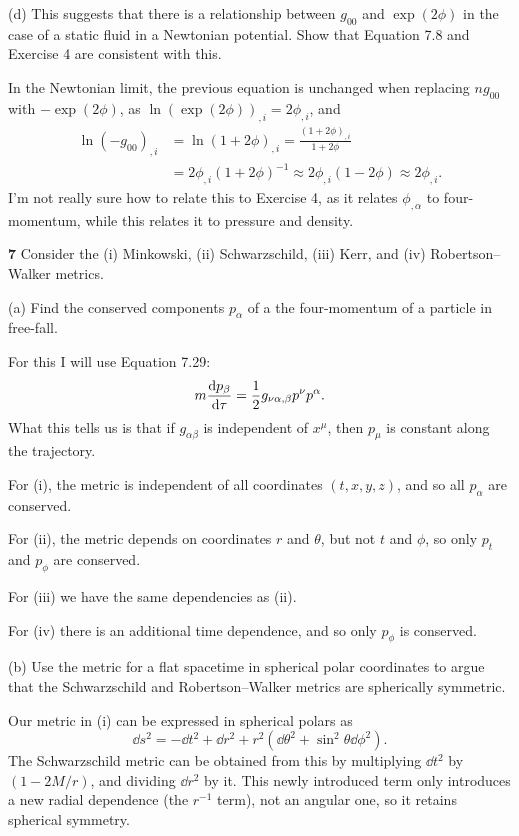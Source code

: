 \documentclass[gr-notes.tex]{subfiles}
\begin{document}
(d) This suggests that there is a relationship between $g_{00}$ and $\exp(2\phi)$ in the case of a static fluid in a Newtonian potential. Show that Equation 7.8 and Exercise 4 are consistent with this.

In the Newtonian limit, the previous equation is unchanged when replacing $ng_{00}$ with $-\exp(2\phi)$, as $\ln(\exp(2\phi))_{,i} = 2 \phi_{,i}$, and
%
\begin{align*}
  \ln(-g_{00})_{,i} &=
  \ln(1 + 2\phi)_{,i} =
  \frac{(1 + 2\phi)_{,i}}{1 + 2\phi}
  \\ &=
  2 \phi_{,i} (1 + 2\phi)^{-1} \approx
  2 \phi_{,i} (1 - 2\phi) \approx
  2 \phi_{,i}.
\end{align*}
%
I'm not really sure how to relate this to Exercise 4, as it relates $\phi_{,\alpha}$ to four-momentum, while this relates it to pressure and density.


\textbf{7}
Consider the (i) Minkowski, (ii) Schwarzschild, (iii) Kerr, and (iv) Robertson--Walker metrics.

(a) Find the conserved components $p_\alpha$ of a the four-momentum of a particle in free-fall.

For this I will use Equation 7.29:
%
\begin{displaymath}
  m \dv{p_\beta}{\tau} = \frac{1}{2} g_{\nu\alpha,\beta} p^\nu p^\alpha.
\end{displaymath}
%
What this tells us is that if $g_{\alpha\beta}$ is independent of $x^\mu$, then $p_\mu$ is constant along the trajectory.

For (i), the metric is independent of all coordinates $(t,x,y,z)$, and so all $p_\alpha$ are conserved.

For (ii), the metric depends on coordinates $r$ and $\theta$, but not $t$ and $\phi$, so only $p_t$ and $p_\phi$ are conserved.

For (iii) we have the same dependencies as (ii).

For (iv) there is an additional time dependence, and so only $p_\phi$ is conserved.


(b) Use the metric for a flat spacetime in spherical polar coordinates to argue that the Schwarzschild and Robertson--Walker metrics are spherically symmetric.

Our metric in (i) can be expressed in spherical polars as
%
\begin{displaymath}
  \dd{s}^2 =
 -\dd{t}^2 + \dd{r}^2 + r^2 (\dd{\theta}^2 + \sin^2\theta \dd{\phi}^2).
\end{displaymath}
%
The Schwarzschild metric can be obtained from this by multiplying $\dd{t}^2$ by $(1 - 2 M / r)$, and dividing $\dd{r}^2$ by it. This newly introduced term only introduces a new radial dependence (the $r^{-1}$ term), not an angular one, so it retains spherical symmetry.
\end{document}
